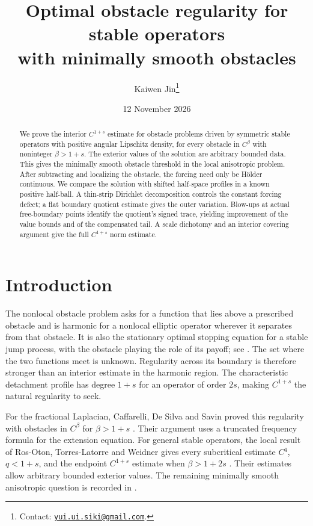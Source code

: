 \documentclass[11pt]{article}
\title{Optimal obstacle regularity for stable operators\\
with minimally smooth obstacles}
\author{Kaiwen Jin\thanks{Contact: \href{mailto:yui.ui.siki@gmail.com}{\texttt{yui.ui.siki@gmail.com}}.}}
\date{12 November 2026}
\numberwithin{equation}{section}
\begin{document}
\maketitle
\begin{abstract}
We prove the interior $C^{1+s}$ estimate for obstacle problems driven by
symmetric stable operators with positive angular Lipschitz density, for every
obstacle in $C^\beta$ with noninteger $\beta>1+s$. The exterior values of the
solution are arbitrary bounded data. This gives the minimally smooth obstacle
threshold in the local anisotropic problem. After subtracting and localizing
the obstacle, the forcing need only be H\"older continuous. We compare the solution
with shifted half-space profiles in a known positive half-ball. A thin-strip
Dirichlet decomposition controls the constant forcing defect; a flat boundary
quotient estimate gives the outer variation. Blow-ups at actual free-boundary
points identify the quotient's signed trace, yielding improvement of the value bounds
and of the compensated tail. A scale dichotomy and an interior covering
argument give the full $C^{1+s}$ norm estimate.
\end{abstract}

\section{Introduction}\label{sec:intro}

The nonlocal obstacle problem asks for a function that lies above a prescribed
obstacle and is harmonic for a nonlocal elliptic operator wherever it separates
from that obstacle. It is also the stationary optimal stopping equation for a
stable jump process, with the obstacle playing the role of its payoff; see
\cite[Chapter 4]{FRRO}. The set where the two functions meet is unknown.
Regularity across its boundary is therefore stronger than an interior
estimate in the harmonic region. The characteristic detachment profile has
degree $1+s$ for an operator of order $2s$, making $C^{1+s}$ the natural
regularity to seek.

For the fractional Laplacian, Caffarelli, De Silva and Savin proved this
regularity with obstacles in $C^\beta$ for $\beta>1+s$
\cite[Theorem 6.1]{CDS}. Their argument uses a truncated frequency formula
for the extension equation. For general stable operators, the local result
of Ros-Oton, Torres-Latorre and Weidner gives every subcritical estimate
$C^q$, $q<1+s$, and the endpoint $C^{1+s}$ estimate when
$\beta>1+2s$ \cite[Corollary 1.3]{RTW}. Their estimates allow arbitrary
bounded exterior values. The remaining minimally smooth anisotropic question
is recorded in \cite[Open Question 4.1, Section 4.6.1]{FRRO}.
\end{document}
